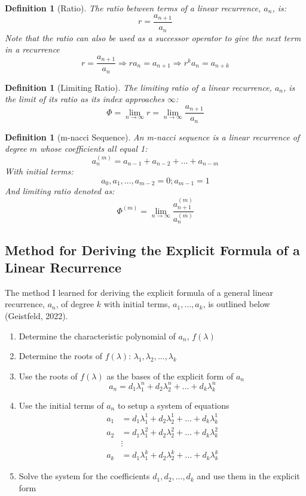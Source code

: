 \documentclass[11pt]{article}
\newtheorem{definition}[theorem]{Definition}
\begin{document}
\begin{definition}[Ratio] The ratio between terms of a linear recurrence, $a_n$, is:
    $$r=\frac{a_{n+1}}{a_{n}}$$
    Note that the ratio can also be used as a successor operator to give the next term in a recurrence 
    $$r=\frac{a_{n+1}}{a_{n}}\Rightarrow r a_n=a_{n+1}\Rightarrow r^k a_n=a_{n+k}$$
\end{definition}

\begin{definition}[Limiting Ratio] The limiting ratio of a linear recurrence, $a_n$, is the limit of its ratio as its index approaches $\infty$:
    $$\Phi=\lim_{n\to\infty}r=\lim_{n\to\infty}\frac{a_{n+1}}{a_{n}}$$
\end{definition}

\begin{definition}[m-nacci Sequence] An m-nacci sequence is a linear recurrence of degree \(m\) whose coefficients all equal 1:
    $$a_n^{(m)}=a_{n-1}+a_{n-2}+\dots +a_{n-m}$$ 
    With initial terms: 
    $$a_0,a_1,\dots,a_{m-2}=0;a_{m-1}=1$$
    And limiting ratio denoted as: 
    \[\Phi^{(m)}=\lim_{n\to\infty} \frac{a_{n+1}^{(m)}}{a_n^{(m)}}\]
\end{definition}

\subsection{Method for Deriving the Explicit Formula of a Linear Recurrence}
The method I learned for deriving the explicit formula of a general linear recurrence, $a_n$, of degree \(k\) with initial terms, \(a_1,\dots,a_k\), is outlined below (Geistfeld, 2022).
\begin{enumerate}
    \item Determine the characteristic polynomial of $a_n$, $f(\lambda)$
    \item Determine the roots of $f(\lambda)$: $\lambda_1,\lambda_2,\dots,\lambda_k$
    \item Use the roots of $f(\lambda)$ as the bases of the explicit form of $a_n$
    \[a_n = d_1\lambda_1^n+d_2\lambda_2^n+\dots+d_k\lambda_k^n\]
    \item Use the initial terms of $a_n$ to setup a system of equations
    \begin{align*}
        a_1 &= d_1\lambda_1^1+d_2\lambda_2^1+\dots+d_k\lambda_k^1 \\
        a_2 &= d_1\lambda_1^2+d_2\lambda_2^2+\dots+d_k\lambda_k^2 \\
        &\vdots \\ 
        a_k &= d_1\lambda_1^k+d_2\lambda_2^k+\dots+d_k\lambda_k^k
    \end{align*}

    \item Solve the system for the coefficients $d_1,d_2,\dots,d_k$ and use them in the explicit form
\end{enumerate}
\end{document}
